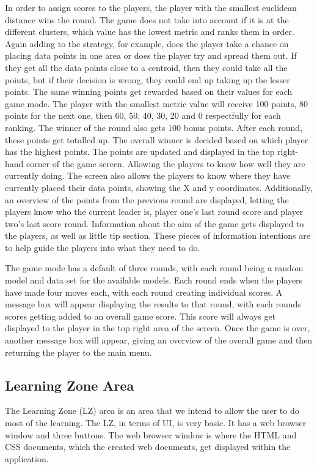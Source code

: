 		In order to assign scores to the players, the player with the smallest euclidean distance wins the round. The game does not take into account if it is at the different clusters, which value has the lowest metric and ranks them in order. Again adding to the strategy, for example, does the player take a chance on placing data points in one area or does the player try and spread them out. If they get all the data points close to a centroid, then they could take all the points, but if their decision is wrong, they could end up taking up the lesser points. The same winning points get rewarded based on their values for each game mode. The player with the smallest metric value will receive 100 points, 80 points for the next one, then 60, 50, 40, 30, 20 and 0 respectfully for each ranking. The winner of the round also gets 100 bonus points. After each round, these points get totalled up. The overall winner is decided based on which player has the highest points. The points are updated and displayed in the top right-hand corner of the game screen. Allowing the players to know how well they are currently doing. The screen also allows the players to know where they have currently placed their data points, showing the X and y coordinates.  Additionally, an overview of the points from the previous round are displayed, letting the players know who the current leader is, player one's last round score and player two's last score round. Information about the aim of the game gets displayed to the players, as well as little tip section. These pieces of information intentions are to help guide the players into what they need to do.
		
		The game mode has a default of three rounds, with each round being a random model and data set for the available models. Each round ends when the players have made four moves each, with each round creating individual scores. A message box will appear displaying the results to that round, with each rounds scores getting added to an overall game score. This score will always get displayed to the player in the top right area of the screen. Once the game is over, another message box will appear, giving an overview of the overall game and then returning the player to the main menu.
	
	
	\subsection{Learning Zone Area}
	
		The Learning Zone (LZ) area is an area that we intend to allow the user to do most of the learning. The LZ, in terms of UI, is very basic. It has a web browser window and three buttons. The web browser window is where the HTML and CSS documents, which the created web documents, get displayed within the application. 
	
